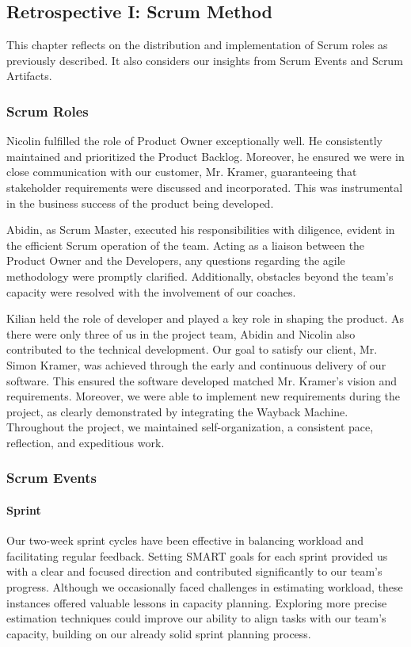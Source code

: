 \subsection{Retrospective I: Scrum Method}
This chapter reflects on the distribution and implementation of Scrum roles as previously described.
It also considers our insights from Scrum Events and Scrum Artifacts.

\subsubsection{Scrum Roles}
Nicolin fulfilled the role of Product Owner exceptionally well.
He consistently maintained and prioritized the Product Backlog.
Moreover, he ensured we were in close communication with our customer, Mr. Kramer, guaranteeing that stakeholder requirements were discussed and incorporated.
This was instrumental in the business success of the product being developed.

Abidin, as Scrum Master, executed his responsibilities with diligence, evident in the efficient Scrum operation of the team.
Acting as a liaison between the Product Owner and the Developers, any questions regarding the agile methodology were promptly clarified.
Additionally, obstacles beyond the team's capacity were resolved with the involvement of our coaches.

Kilian held the role of developer and played a key role in shaping the product.
As there were only three of us in the project team, Abidin and Nicolin also contributed to the technical development.
Our goal to satisfy our client, Mr. Simon Kramer, was achieved through the early and continuous delivery of our software.
This ensured the software developed matched Mr. Kramer's vision and requirements.
Moreover, we were able to implement new requirements during the project, as clearly demonstrated by integrating the Wayback Machine.
Throughout the project, we maintained self-organization, a consistent pace, reflection, and expeditious work.

\subsubsection{Scrum Events}

\paragraph{Sprint}
Our two-week sprint cycles have been effective in balancing workload and facilitating regular feedback.
Setting SMART goals for each sprint provided us with a clear and focused direction and contributed significantly to our team's progress.
Although we occasionally faced challenges in estimating workload, these instances offered valuable lessons in capacity planning.
Exploring more precise estimation techniques could improve our ability to align tasks with our team's capacity, building on our already solid sprint planning process.

